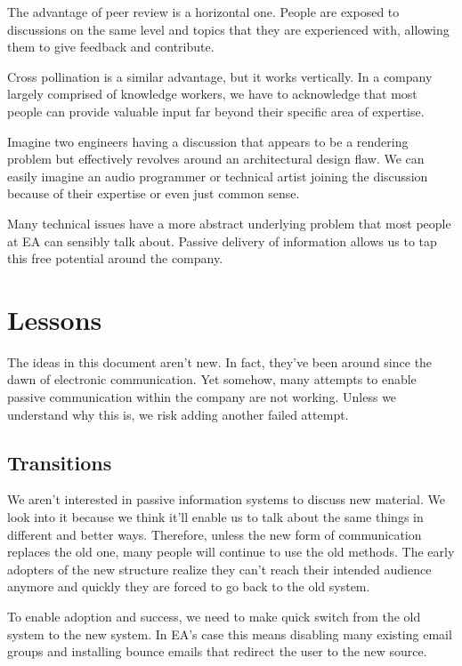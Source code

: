 \documentclass[twocolumn]{paper}
\begin{document}
The advantage of peer review is a horizontal one. People are exposed
to discussions on the same level and topics that they are
experienced with, allowing them to give feedback and contribute.

Cross pollination is a similar advantage, but it works vertically.
In a company largely comprised of knowledge workers, we have to
acknowledge that most people can provide valuable input far beyond
their specific area of expertise.

Imagine two engineers having a discussion that appears to be a
rendering problem but effectively revolves around an architectural
design flaw. We can easily imagine an audio programmer or technical
artist joining the discussion because of their expertise or even
just common sense.

Many technical issues have a more abstract underlying problem that
most people at EA can sensibly talk about. Passive delivery of
information allows us to tap this free potential around the company.

\section{Lessons}

The ideas in this document aren't new. In fact, they've been around
since the dawn of electronic communication. Yet somehow, many
attempts to enable passive communication within the company are not
working. Unless we understand why this is, we risk adding another
failed attempt.

\subsection{Transitions}

We aren't interested in passive information systems to discuss new
material. We look into it because we think it'll enable us to talk
about the same things in different and better ways. Therefore,
unless the new form of communication replaces the old one, many
people will continue to use the old methods. The early adopters of
the new structure realize they can't reach their intended audience
anymore and quickly they are forced to go back to the old system.

To enable adoption and success, we need to make quick switch from
the old system to the new system. In EA's case this means disabling
many existing email groups and installing bounce emails that
redirect the user to the new source.
\end{document}
